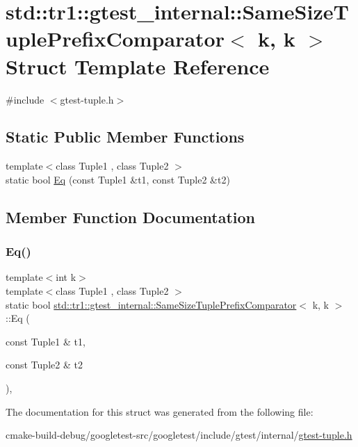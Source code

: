 \hypertarget{structstd_1_1tr1_1_1gtest__internal_1_1SameSizeTuplePrefixComparator_3_01k_00_01k_01_4}{}\section{std\+::tr1\+::gtest\+\_\+internal\+::Same\+Size\+Tuple\+Prefix\+Comparator$<$ k, k $>$ Struct Template Reference}
\label{structstd_1_1tr1_1_1gtest__internal_1_1SameSizeTuplePrefixComparator_3_01k_00_01k_01_4}


{\ttfamily \#include $<$gtest-\/tuple.\+h$>$}

\subsection*{Static Public Member Functions}
\begin{DoxyCompactItemize}
\item 
{\footnotesize template$<$class Tuple1 , class Tuple2 $>$ }\\static bool \mbox{\hyperlink{structstd_1_1tr1_1_1gtest__internal_1_1SameSizeTuplePrefixComparator_3_01k_00_01k_01_4_a5564fbade05a2d0522d9899da62c2119}{Eq}} (const Tuple1 \&t1, const Tuple2 \&t2)
\end{DoxyCompactItemize}


\subsection{Member Function Documentation}
\mbox{\label{structstd_1_1tr1_1_1gtest__internal_1_1SameSizeTuplePrefixComparator_3_01k_00_01k_01_4_a5564fbade05a2d0522d9899da62c2119}} 
\subsubsection{\texorpdfstring{Eq()}{Eq()}}
{\footnotesize\ttfamily template$<$int k$>$ \\
template$<$class Tuple1 , class Tuple2 $>$ \\
static bool \mbox{\hyperlink{structstd_1_1tr1_1_1gtest__internal_1_1SameSizeTuplePrefixComparator}{std\+::tr1\+::gtest\+\_\+internal\+::\+Same\+Size\+Tuple\+Prefix\+Comparator}}$<$ k, k $>$\+::Eq (\begin{DoxyParamCaption}\item[{const Tuple1 \&}]{t1,  }\item[{const Tuple2 \&}]{t2 }\end{DoxyParamCaption})\hspace{0.3cm}{\ttfamily [inline]}, {\ttfamily [static]}}



The documentation for this struct was generated from the following file\+:\begin{DoxyCompactItemize}
\item 
cmake-\/build-\/debug/googletest-\/src/googletest/include/gtest/internal/\mbox{\hyperlink{gtest-tuple_8h}{gtest-\/tuple.\+h}}\end{DoxyCompactItemize}
